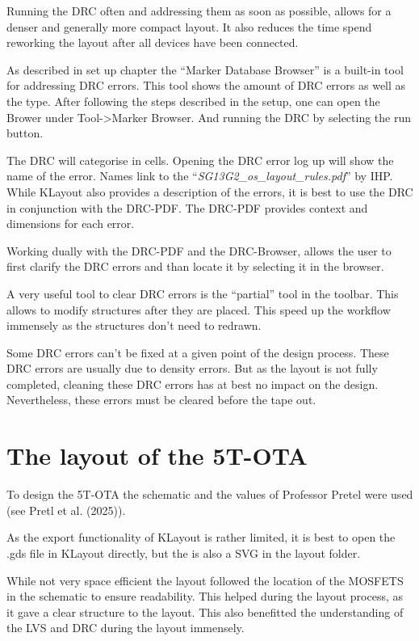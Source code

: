 \documentclass[
  letterpaper,
]{scrbook}
\begin{document}
Running the DRC often and addressing them as soon as possible, allows
for a denser and generally more compact layout. It also reduces the time
spend reworking the layout after all devices have been connected.

As described in set up chapter the ``Marker Database Browser'' is a
built-in tool for addressing DRC errors. This tool shows the amount of
DRC errors as well as the type. After following the steps described in
the setup, one can open the Brower under Tool-\textgreater Marker
Browser. And running the DRC by selecting the run button.

The DRC will categorise in cells. Opening the DRC error log up will show
the name of the error. Names link to the
``\emph{SG13G2\_os\_layout\_rules.pdf}'' by IHP. While KLayout also
provides a description of the errors, it is best to use the DRC in
conjunction with the DRC-PDF. The DRC-PDF provides context and
dimensions for each error.

Working dually with the DRC-PDF and the DRC-Browser, allows the user to
first clarify the DRC errors and than locate it by selecting it in the
browser.

A very useful tool to clear DRC errors is the ``partial'' tool in the
toolbar. This allows to modify structures after they are placed. This
speed up the workflow immensely as the structures don't need to redrawn.

Some DRC errors can't be fixed at a given point of the design process.
These DRC errors are usually due to density errors. But as the layout is
not fully completed, cleaning these DRC errors has at best no impact on
the design. Nevertheless, these errors must be cleared before the tape
out.

\section{The layout of the 5T-OTA}\label{the-layout-of-the-5t-ota}

To design the 5T-OTA the schematic and the values of Professor Pretel
were used (see Pretl et al. (2025)).

As the export functionality of KLayout is rather limited, it is best to
open the .gds file in KLayout directly, but the is also a SVG in the
layout folder.

While not very space efficient the layout followed the location of the
MOSFETS in the schematic to ensure readability. This helped during the
layout process, as it gave a clear structure to the layout. This also
benefitted the understanding of the LVS and DRC during the layout
immensely.
\end{document}
